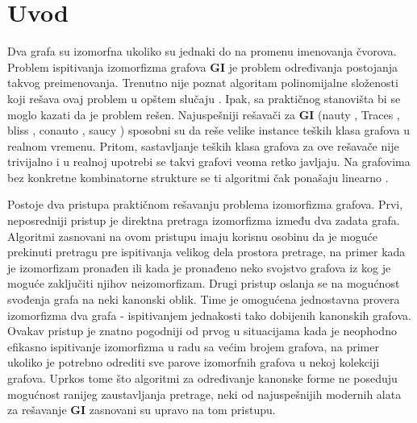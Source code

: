 \documentclass[12pt,oneside]{memoir}
\theoremstyle{definition}
\begin{document}
\frontmatter
\naslovna
\komisija
\apstrakt
\tableofcontents*

\mainmatter

\chapter{Uvod}

 Dva grafa su izomorfna ukoliko su jednaki do na promenu imenovanja čvorova.
 Problem ispitivanja izomorfizma grafova \textbf{GI} je problem određivanja
 postojanja takvog preimenovanja. Trenutno nije poznat algoritam polinomijalne
 složenosti koji rešava ovaj problem u opštem slučaju \cite{Babai}. Ipak, sa
 praktičnog stanovišta bi se moglo kazati da je problem rešen. Najuspešniji
 rešavači za \textbf{GI} (nauty \cite{McKay1,McKay}, Traces
 \cite{Piperno,McKay}, bliss \cite{Bliss}, conauto \cite{Conauto}, saucy
 \cite{Saucy}) sposobni su da reše velike instance teških klasa grafova u
 realnom vremenu. Pritom, sastavljanje teških klasa grafova za ove rešavače
 nije trivijalno i u realnoj upotrebi se takvi grafovi veoma retko javljaju. Na
 grafovima bez konkretne kombinatorne strukture se ti algoritmi čak ponašaju
 linearno \cite{Benchmark}.

 Postoje dva pristupa praktičnom rešavanju problema izomorfizma grafova. Prvi,
 neposredniji pristup je direktna pretraga izomorfizma između dva zadata grafa.
 Algoritmi zasnovani na ovom pristupu imaju korisnu osobinu da je moguće
 prekinuti pretragu pre ispitivanja velikog dela prostora pretrage, na primer
 kada je izomorfizam pronađen ili kada je pronađeno neko svojstvo grafova iz
 kog je moguće zaključiti njihov neizomorfizam. Drugi pristup oslanja se na
 mogućnost svođenja grafa na neki kanonski oblik. Time je omogućena jednostavna
 provera izomorfizma dva grafa - ispitivanjem jednakosti tako dobijenih
 kanonskih grafova. Ovakav pristup je znatno pogodniji od prvog u situacijama
 kada je neophodno efikasno ispitivanje izomorfizma u radu sa većim brojem
 grafova, na primer ukoliko je potrebno odrediti sve parove izomorfnih grafova
 u nekoj kolekciji grafova.  Uprkos tome što algoritmi za određivanje kanonske
 forme ne poseduju mogućnost ranijeg zaustavljanja pretrage, neki od
 najuspešnijih modernih alata za rešavanje \textbf{GI} zasnovani su upravo na
 tom pristupu. 
\end{document}
